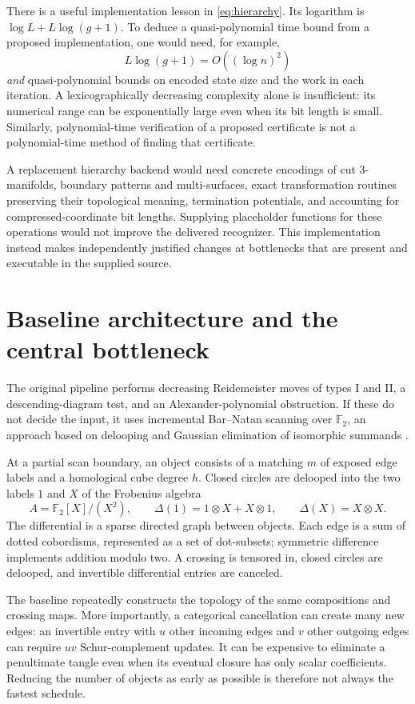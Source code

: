 \documentclass[11pt]{article}
\theoremstyle{remark}\newtheorem{remark}[theorem]{Remark}
\newcommand{\F}{\mathbb F}
\begin{document}
There is a useful implementation lesson in \eqref{eq:hierarchy}. Its logarithm
is $\log L+L\log(g+1)$. To deduce a quasi-polynomial time bound from a proposed
implementation, one would need, for example,
\[
 L\log(g+1)=O((\log n)^2)
\]
\emph{and} quasi-polynomial bounds on encoded state size and the work in each
iteration. A lexicographically decreasing complexity alone is insufficient:
its numerical range can be exponentially large even when its bit length is
small. Similarly, polynomial-time verification of a proposed certificate
is not a polynomial-time method of finding that certificate.

A replacement hierarchy backend would need concrete encodings of cut
3-manifolds, boundary patterns and multi-surfaces, exact transformation
routines preserving their topological meaning, termination potentials,
and accounting for compressed-coordinate bit lengths. Supplying placeholder
functions for these operations would not improve the delivered recognizer.
This implementation instead makes independently justified changes at
bottlenecks that are present and executable in the supplied source.

\section{Baseline architecture and the central bottleneck}
The original pipeline performs decreasing Reidemeister moves of types I and
II, a descending-diagram test, and an Alexander-polynomial obstruction. If
these do not decide the input, it uses incremental Bar--Natan scanning over
$\F_2$, an approach based on delooping and Gaussian elimination of isomorphic
summands \cite{BarNatan}.

At a partial scan boundary, an object consists of a matching $m$ of exposed
edge labels and a homological cube degree $h$. Closed circles are delooped
into the two labels $1$ and $X$ of the Frobenius algebra
\[
 A=\F_2[X]/(X^2),\qquad
 \Delta(1)=1\otimes X+X\otimes1,\qquad
 \Delta(X)=X\otimes X.
\]
The differential is a sparse directed graph between objects. Each edge is
a sum of dotted cobordisms, represented as a set of dot-subsets; symmetric
difference implements addition modulo two. A crossing is tensored in,
closed circles are delooped, and invertible differential entries are canceled.

The baseline repeatedly constructs the topology of the same compositions
and crossing maps. More importantly, a categorical cancellation can create
many new edges: an invertible entry with $u$ other incoming edges and $v$
other outgoing edges can require $uv$ Schur-complement updates. It can be
expensive to eliminate a penultimate tangle even when its eventual closure
has only scalar coefficients. Reducing the number of objects as early as
possible is therefore not always the fastest schedule.
\end{document}
